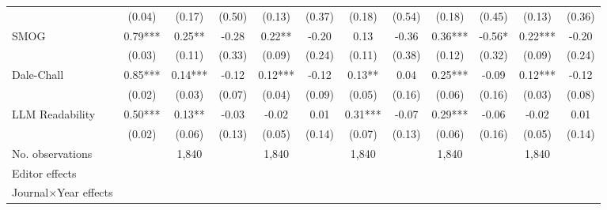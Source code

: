 \begin{table}
\begin{threeparttable}
\begin{tabular}{p{3cm}S@{}S@{}S@{}S@{}S@{}S@{}S@{}S@{}S@{}S@{}S@{}}
                                          &      (0.04)   &      (0.17)   &      (0.50)   &      (0.13)   &      (0.37)   &      (0.18)   &      (0.54)   &      (0.18)   &      (0.45)   &      (0.13)   &      (0.36)   \\
            SMOG                          &        0.79***&        0.25** &       -0.28   &        0.22** &       -0.20   &        0.13   &       -0.36   &        0.36***&       -0.56*  &        0.22***&       -0.20   \\
                                          &      (0.03)   &      (0.11)   &      (0.33)   &      (0.09)   &      (0.24)   &      (0.11)   &      (0.38)   &      (0.12)   &      (0.32)   &      (0.09)   &      (0.24)   \\
            Dale-Chall                    &        0.85***&        0.14***&       -0.12   &        0.12***&       -0.12   &        0.13** &        0.04   &        0.25***&       -0.09   &        0.12***&       -0.12   \\
                                          &      (0.02)   &      (0.03)   &      (0.07)   &      (0.04)   &      (0.09)   &      (0.05)   &      (0.16)   &      (0.06)   &      (0.16)   &      (0.03)   &      (0.08)   \\
            LLM Readability               &        0.50***&        0.13** &       -0.03   &       -0.02   &        0.01   &        0.31***&       -0.07   &        0.29***&       -0.06   &       -0.02   &        0.01   \\
                                          &      (0.02)   &      (0.06)   &      (0.13)   &      (0.05)   &      (0.14)   &      (0.07)   &      (0.13)   &      (0.06)   &      (0.16)   &      (0.05)   &      (0.14)   \\
            \midrule
            No. observations              &               &       1,840   &               &       1,840   &               &       1,840   &               &       1,840   &               &       1,840   &               \\
            \midrule
            Editor effects       &               &           {}   &               &           {}   &               &           {}   &               &           {}   &               &               &               \\
            Journal\(\times\)Year effects          &               &           {}   &               &           {}   &               &           {}   &               &           {}   &               &               &               \\

\end{tabular}
\end{threeparttable}
\end{table}
